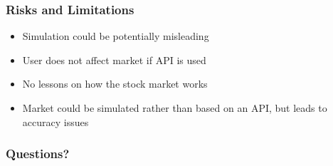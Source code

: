 \documentclass{beamer}
\begin{document}
\begin{frame}
\frametitle{Risks and Limitations}
\begin{itemize}

\item{Simulation could be potentially misleading}
\item{User does not affect market if API is used}
\item{No lessons on how the stock market works}
\item{Market could be simulated rather than based on an API, but leads to accuracy issues}

\end{itemize}

\end{frame}

\begin{frame}
\begin{center}
\frametitle{Questions?}
\end{center}
\end{frame}
\end{document}
